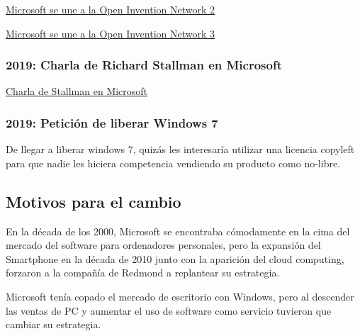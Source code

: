 \href{https://www.zdnet.com/article/what-does-microsoft-joining-the-open-invention-network-mean-for-you/}{Microsoft se une a la Open Invention Network 2}

\href{https://www.muycomputerpro.com/2018/10/10/microsoft-se-une-a-open-invention-network}{Microsoft se une a la Open Invention Network 3}

\subsubsection{2019: Charla de Richard Stallman en Microsoft}
\href{https://stallman.org/articles/microsoft-talk.html}{Charla de Stallman en Microsoft}

\subsubsection{2019: Petición de liberar Windows 7}
De llegar a liberar windows 7, quizás les interesaría utilizar una licencia copyleft para que nadie les hiciera competencia vendiendo su producto como no-libre.

\subsection{Motivos para el cambio}
En la década de los 2000, Microsoft se encontraba cómodamente en la cima del mercado del software para ordenadores personales, pero la expansión del Smartphone en la década de 2010 junto con la aparición del cloud computing, forzaron a la compañía de Redmond a replantear su estrategia.

Microsoft tenía copado el mercado de escritorio con Windows, pero al descender las ventas de PC y aumentar el uso de software como servicio tuvieron que cambiar su estrategia. 
